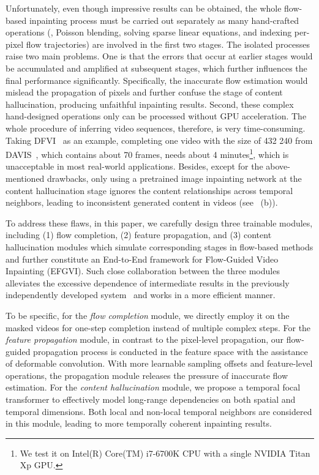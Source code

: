 \documentclass[final]{cvpr}
\newcommand{\methodname}{EFGVI}
\begin{document}
Unfortunately, even though impressive results can be obtained, the whole flow-based inpainting process must be carried out separately as many hand-crafted operations 
(\eg, Poisson blending, solving sparse linear equations, and indexing per-pixel flow trajectories) are involved in the first two stages.
The isolated processes raise two main problems.
One is that the errors that occur at earlier stages would be accumulated and amplified at subsequent stages, which further influences the final performance significantly.
Specifically, the inaccurate flow estimation would mislead the propagation of pixels and further confuse the stage of content hallucination, producing unfaithful inpainting results.
Second, these complex hand-designed operations only can be processed without GPU acceleration.
The whole procedure of inferring video sequences, therefore, is very time-consuming.
Taking DFVI~\cite{Xu_2019_CVPR} as an example, completing one video with the size of 432  240 from DAVIS~\cite{perazzi2016benchmark}, 
which contains about 70 frames, needs about 4 minutes\footnote{We test it on Intel(R) Core(TM) i7-6700K CPU with a single NVIDIA Titan Xp GPU.}, which is unacceptable in most real-world applications.
Besides, except for the above-mentioned drawbacks, only using a pretrained image inpainting network at the content hallucination stage ignores the content relationships across temporal neighbors, leading to inconsistent generated content in videos (see ~(b)).

To address these flaws, in this paper, we carefully design three trainable modules, including (1) flow completion, (2) feature propagation, and (3) content hallucination modules which simulate corresponding stages in flow-based methods and further constitute an End-to-End framework for Flow-Guided Video Inpainting (\methodname).
Such close collaboration between the three modules alleviates the excessive dependence of intermediate results in the previously independently developed system~\cite{kim2019deep,Xu_2019_CVPR, Gao-ECCV-FGVC, zou2020progressive, lao2021flow} and works in a more efficient manner.

To be specific, for the \textit{flow completion} module, we directly employ it on the masked videos for one-step completion instead of multiple complex steps.
For the \textit{feature propagation} module, in contrast to the pixel-level propagation, our flow-guided propagation process is conducted in the feature space with the assistance of deformable convolution.
With more learnable sampling offsets and feature-level operations, the propagation module releases the pressure of inaccurate flow estimation.
For the \textit{content hallucination} module, we propose a temporal focal transformer to effectively model long-range dependencies on both spatial and temporal dimensions.
Both local and non-local temporal neighbors are considered in this module, leading to more temporally coherent inpainting results.
\end{document}
